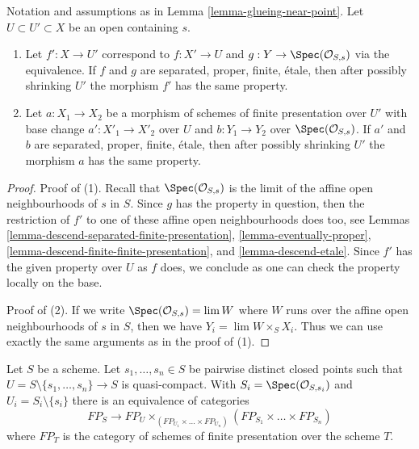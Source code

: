 \begin{lemma}
\label{lemma-glueing-near-point-properties}
Notation and assumptions as in Lemma \ref{lemma-glueing-near-point}.
Let $U \subset U' \subset X$ be an open containing $s$.
\begin{enumerate}
\item  Let $f' : X \to U'$ correspond to $f : X' \to U$ and
$g : Y \to \Spec(\mathcal{O}_{S, s})$
via the equivalence. If $f$ and $g$ are separated, proper, finite, \'etale,
then after possibly shrinking $U'$ the morphism $f'$ has the same property.
\item Let $a : X_1 \to X_2$
be a morphism of schemes of finite presentation over $U'$
with base change $a' : X'_1 \to X'_2$ over $U$ and
$b : Y_1 \to Y_2$ over $\Spec(\mathcal{O}_{S, s})$.
If $a'$ and $b$ are separated, proper, finite, \'etale,
then after possibly shrinking $U'$ the morphism $a$ has the same property.
\end{enumerate}
\end{lemma}

\begin{proof}
Proof of (1). Recall that $\Spec(\mathcal{O}_{S, s})$ is the limit of the
affine open neighbourhoods of $s$ in $S$. Since $g$ has the property
in question, then the restriction of $f'$ to one of these
affine open neighbourhoods does too, see
Lemmas \ref{lemma-descend-separated-finite-presentation},
\ref{lemma-eventually-proper},
\ref{lemma-descend-finite-finite-presentation}, and
\ref{lemma-descend-etale}.
Since $f'$ has the given property over $U$ as $f$ does,
we conclude as one can check the property locally on the base.

\medskip\noindent
Proof of (2). If we write $\Spec(\mathcal{O}_{S, s}) = \lim W$
where $W$ runs over the affine open neighbourhoods of $s$ in $S$,
then we have $Y_i = \lim W \times_S X_i$. Thus we can use
exactly the same arguments as in the proof of (1).
\end{proof}

\begin{lemma}
\label{lemma-glueing-near-multiple-closed-points}
Let $S$ be a scheme. Let $s_1, \ldots, s_n \in S$ be pairwise distinct
closed points such that
$U = S \setminus \{s_1, \ldots, s_n\} \to S$ is quasi-compact. With
$S_i = \Spec(\mathcal{O}_{S, s_i})$ and $U_i = S_i \setminus \{s_i\}$
there is an equivalence of categories
$$
FP_S \longrightarrow
FP_U \times_{(FP_{U_1} \times \ldots \times FP_{U_n})}
(FP_{S_1} \times \ldots \times FP_{S_n})
$$
where $FP_T$ is the category of schemes of finite presentation over
the scheme $T$.
\end{lemma}

